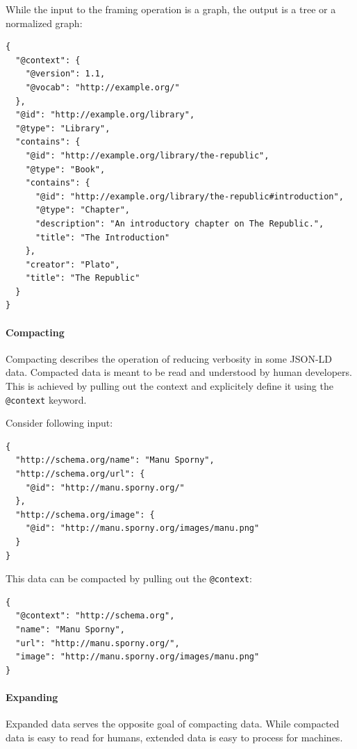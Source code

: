While the input to the framing operation is a graph, the output is a tree or a normalized graph:

\lstset{language=JSON}
\begin{lstlisting}[caption=Framed data of a library]
{
  "@context": {
    "@version": 1.1,
    "@vocab": "http://example.org/"
  },
  "@id": "http://example.org/library",
  "@type": "Library",
  "contains": {
    "@id": "http://example.org/library/the-republic",
    "@type": "Book",
    "contains": {
      "@id": "http://example.org/library/the-republic#introduction",
      "@type": "Chapter",
      "description": "An introductory chapter on The Republic.",
      "title": "The Introduction"
    },
    "creator": "Plato",
    "title": "The Republic"
  }
}
\end{lstlisting}

\paragraph{Compacting}\label{jsonldcompacting}

Compacting describes the operation of reducing verbosity in some JSON-LD data. Compacted data is meant to be read and understood by human developers. This is achieved by pulling out the context and explicitely define it using the \lstinline{@context} keyword.

Consider following input:

\lstset{language=JSON}
\begin{lstlisting}[caption=Verbose data of a person]
{
  "http://schema.org/name": "Manu Sporny",
  "http://schema.org/url": {
    "@id": "http://manu.sporny.org/"
  },
  "http://schema.org/image": {
    "@id": "http://manu.sporny.org/images/manu.png"
  }
}
\end{lstlisting}

This data can be compacted by pulling out the \lstinline{@context}:

\lstset{language=JSON}
\begin{lstlisting}[caption=Compacted and easy-to-read data of a person]
{
  "@context": "http://schema.org",
  "name": "Manu Sporny",
  "url": "http://manu.sporny.org/",
  "image": "http://manu.sporny.org/images/manu.png"
}
\end{lstlisting}

\paragraph{Expanding}\label{jsonldextending}
Expanded data serves the opposite goal of compacting data. While compacted data is easy to read for humans, extended data is easy to process for machines.


